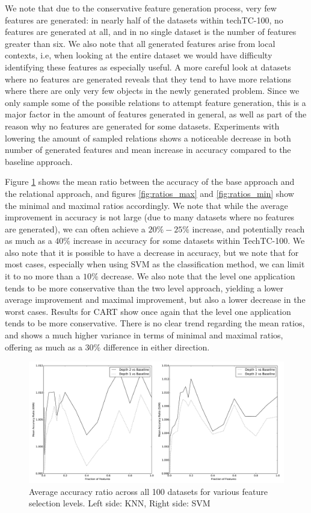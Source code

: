 \documentclass{article}
\theoremstyle{definition}
\begin{document}
We note that due to the conservative feature generation process, very few features are generated: in nearly half of the datasets within techTC-100, no features are generated at all, and in no single dataset is the number of features greater than six. We also note that all generated features arise from local contexts, i.e, when looking at the entire dataset we would have difficulty identifying these features as especially useful. A more careful look at datasets where no features are generated reveals that they tend to have more relations where there are only very few objects in the newly generated problem. Since we only sample some of the possible relations to attempt feature generation, this is a major factor in the amount of features generated in general, as well as part of the reason why no features are generated for some datasets. Experiments with lowering the amount of sampled relations shows a noticeable decrease in both number of generated features and mean increase in accuracy compared to the baseline approach.

Figure \ref{fig:ratios} shows the mean ratio between the accuracy of the base approach and the relational approach, and figures \ref{fig:ratios_max} and \ref{fig:ratios_min} show the minimal and maximal ratios accordingly. We note that while the average improvement in accuracy is not large (due to many datasets where no features are generated), we can often achieve a $20\%-25\%$ increase, and potentially reach as much as a $40\%$ increase in accuracy for some datasets within TechTC-100. We also note that it is possible to have a decrease in accuracy, but we note that for most cases, especially when using SVM as the classification method, we can limit it to no more than a $10\%$ decrease. We also note that the level one application tends to be more conservative than the two level approach, yielding a lower average improvement and maximal improvement, but also a lower decrease in the worst cases.
Results for CART show once again that the level one application tends to be more conservative. There is no clear trend regarding the mean ratios, and shows a much higher variance in terms of minimal and maximal ratios, offering as much as a $30\%$ difference in either direction.

\begin{figure}[H]
	\centering
	\includegraphics[width=\linewidth]{ratios2.pdf}
	\caption{Average accuracy ratio across all 100 datasets for various feature selection levels. Left side: KNN, Right side: SVM}
	\label{fig:ratios}
\end{figure}
\end{document}
